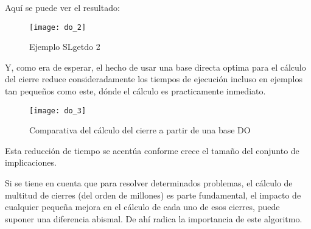 Aqu\'i se puede ver el resultado:
\begin{figure}[H]
    \centering
    \texttt{[image: do\_2]}
    \caption{Ejemplo SLgetdo 2}
    \label{fig:do_2}
\end{figure} 
Y, como era de esperar, el hecho de usar una base directa optima para el c\'alculo del cierre reduce consideradamente los tiempos de ejecuci\'on incluso en ejemplos tan peque\~nos como este, d\'onde el c\'alculo es practicamente inmediato.
\begin{figure}[H]
    \centering
    \texttt{[image: do\_3]}
    \caption{Comparativa del c\'alculo del cierre a partir de una base DO}
    \label{fig:do_3}
\end{figure} 

Esta reducci\'on de tiempo se acent\'ua conforme crece el tama\~no del conjunto de implicaciones.

Si se tiene en cuenta que para resolver determinados problemas, el c\'alculo de multitud de cierres (del orden de millones) es parte fundamental,\cite{Adaricheva} el impacto de cualquier peque\~na mejora en el c\'alculo de cada uno de esos cierres, puede suponer una diferencia abismal. De ah\'i radica la importancia de este algoritmo.

